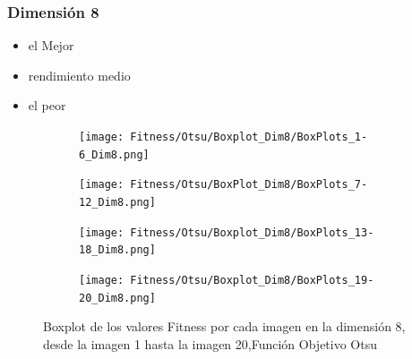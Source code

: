 \documentclass[conference]{IEEEtran}
\begin{document}
\subsubsection{Dimensión 8}
\begin{itemize}
\item el Mejor
\item rendimiento medio
\item el peor
\end{itemize}
\begin{figure}
	\centering
	
	\begin{subfigure}{0.4\textwidth}
		\texttt{[image: Fitness/Otsu/Boxplot\_Dim8/BoxPlots\_1-6\_Dim8.png]}
	\end{subfigure}
	
	\begin{subfigure}{0.4\textwidth}
		\texttt{[image: Fitness/Otsu/BoxPlot\_Dim8/BoxPlots\_7-12\_Dim8.png]}
	\end{subfigure}
	\begin{subfigure}{0.4\textwidth}
		\texttt{[image: Fitness/Otsu/Boxplot\_Dim8/BoxPlots\_13-18\_Dim8.png]}
	\end{subfigure}
	\begin{subfigure}{0.4\textwidth}
		\texttt{[image: Fitness/Otsu/Boxplot\_Dim8/BoxPlots\_19-20\_Dim8.png]}
		\vspace{-120pt} %
	\end{subfigure}
	\caption{Boxplot de los valores Fitness por cada imagen en la dimensión 8, desde la imagen 1 hasta la imagen 20,Función Objetivo Otsu}
	\label{fig:imagenes}    
\end{figure}
\end{document}
